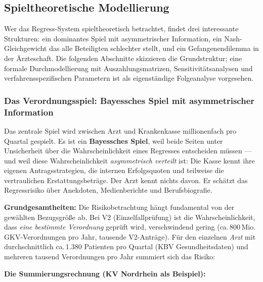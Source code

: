 \documentclass{umbruch-position}
\begin{document}
\subsection{Spieltheoretische Modellierung}

Wer das Regress-System spieltheoretisch betrachtet, findet drei interessante Strukturen: ein dominantes Spiel mit asymmetrischer Information, ein Nash-Gleichgewicht das alle Beteiligten schlechter stellt, und ein Gefangenendilemma in der Ärzteschaft. Die folgenden Abschnitte skizzieren die Grundstruktur; eine formale Durchmodellierung mit Auszahlungsmatrizen, Sensitivitätsanalysen und verfahrensspezifischen Parametern ist als eigenständige Folgeanalyse vorgesehen.

\subsubsection{Das Verordnungsspiel: Bayessches Spiel mit asymmetrischer Information}

Das zentrale Spiel wird zwischen Arzt und Krankenkasse millionenfach pro Quartal gespielt. Es ist ein \textbf{Bayessches Spiel}, weil beide Seiten unter Unsicherheit über die Wahrscheinlichkeit eines Regresses entscheiden müssen — und weil diese Wahrscheinlichkeit \textit{asymmetrisch verteilt} ist: Die Kasse kennt ihre eigenen Antragsstrategien, die internen Erfolgsquoten und teilweise die vertraulichen Erstattungsbeträge. Der Arzt kennt nichts davon. Er schätzt das Regressrisiko über Anekdoten, Medienberichte und Berufsbiografie.

\textbf{Grundgesamtheiten:} Die Risikobetrachtung hängt fundamental von der gewählten Bezugsgröße ab. Bei V2 (Einzelfallprüfung) ist die Wahrscheinlichkeit, dass \textit{eine bestimmte Verordnung} geprüft wird, verschwindend gering (ca.\,800\,Mio. GKV-Verordnungen pro Jahr, tausende V2-Anträge). Für den einzelnen \textit{Arzt} mit durchschnittlich ca.\,1.380 Patienten pro Quartal (KBV Gesundheitsdaten) und mehreren tausend Verordnungen pro Jahr summiert sich das Risiko:

\label{sec:summierungsrechnung}
\textbf{Die Summierungsrechnung (KV Nordrhein als Beispiel):}
\end{document}
